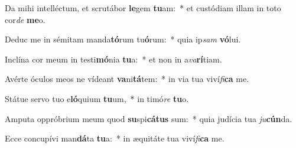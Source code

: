 \item Da mihi intelléctum, et scrutábor \textbf{le}gem \textbf{tu}am:~* et custódiam illam in toto cor\textit{de} \textbf{me}o.
\item Deduc me in sémitam manda\textbf{tó}rum tu\textbf{ó}rum:~* quia ip\textit{sam} \textbf{vó}lui.
\item Inclína cor meum in testi\textbf{mó}nia \textbf{tu}a:~* et non in a\textit{va}\textbf{rí}tiam.
\item Avérte óculos meos ne vídeant \textbf{va}ni\textbf{tá}tem:~* in via tua viví\textit{fi}\textbf{ca} me.
\item Státue servo tuo e\textbf{ló}quium \textbf{tu}um,~* in timó\textit{re} \textbf{tu}o.
\item Amputa oppróbrium meum quod \textbf{su}spi\textbf{cá}\textbf{tus} sum:~* quia judícia tua \textit{ju}\textbf{cún}da.
\item Ecce concupívi man\textbf{dá}ta \textbf{tu}a:~* in æquitáte tua viví\textit{fi}\textbf{ca} me.
